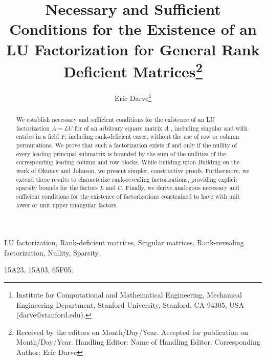 \documentclass[10pt,twoside]{siamart1116}
\newcommand{\HE}{Name of Handling Editor}
\newcommand{\DoS}{Month/Day/Year}
\newcommand{\DoA}{Month/Day/Year}
\newcommand{\CA}{Eric Darve}
\newcommand{\Names}{Eric Darve}
\newcommand{\Title}{Necessary and Sufficient Conditions for the Existence of an LU Factorization for General Rank Deficient Matrices}
\numberwithin{theorem}{section}
\providecommand{\DIFadd}[1]{{\protect\color{blue} \sf #1}} %
\providecommand{\DIFdel}[1]{{\protect\color{red} \scriptsize #1}} %
\providecommand{\DIFaddbegin}{} %
\providecommand{\DIFaddend}{} %
\providecommand{\DIFdelbegin}{} %
\providecommand{\DIFdelend}{} %
\begin{document}
% 

%
\setcounter{page}{1}

\thispagestyle{empty}

\title{\Title\thanks{Received
    by the editors on \DoS.
    Accepted for publication on \DoA.
Handling Editor: \HE. Corresponding Author: \CA}}

\author{
  Eric Darve\thanks{Institute for Computational and Mathematical Engineering,
    Mechanical Engineering Department,
    Stanford University,
    Stanford, CA 94305, USA
  (darve@stanford.edu).}
}


\maketitle

\begin{abstract}
  We establish necessary and sufficient conditions for the existence of an LU factorization $A=LU$ \DIFdelbegin \DIFdel{for }\DIFdelend \DIFaddbegin \DIFadd{of }\DIFaddend an arbitrary square matrix $A$ \DIFdelbegin \DIFdel{, including singular and }\DIFdelend \DIFaddbegin \DIFadd{with entries in a field $F$, including }\DIFaddend rank-deficient cases, without \DIFdelbegin \DIFdel{the use of }\DIFdelend row or column permutations. We prove that such a factorization exists if and only if the nullity of every leading principal submatrix is bounded by the sum of the nullities of the corresponding leading column and row blocks. \DIFdelbegin \DIFdel{While building upon }\DIFdelend \DIFaddbegin \DIFadd{Building on }\DIFaddend the work of Okunev and Johnson, we present simpler, constructive proofs. Furthermore, we extend these results to characterize rank-revealing factorizations, providing explicit sparsity bounds for the factors $L$ and $U$. Finally, we derive analogous necessary and sufficient conditions for the existence of factorizations \DIFdelbegin \DIFdel{constrained to have }\DIFdelend \DIFaddbegin \DIFadd{with }\DIFaddend unit lower or unit upper triangular factors.
\end{abstract}

\begin{keywords}
  LU factorization, Rank-deficient matrices, Singular matrices, Rank-revealing factorization, Nullity, Sparsity.
\end{keywords}
\begin{AMS}
  15A23, 15A03, 65F05.
\end{AMS}
\end{document}
